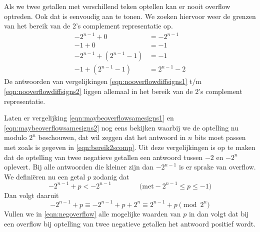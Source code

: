 \documentclass[a4paper,12pt,oneside]{article}
\theoremstyle{own}
\begin{document}
Als we twee getallen met verschillend teken optellen kan er nooit overflow
optreden. Ook dat is eenvoudig aan te tonen. We zoeken hiervoor weer de grenzen
van het bereik van de 2's complement representatie op.
%
\begin{align}
\label{eqn:nooverflowdiffsigns1}
        -2^{n-1} + 0 &= -2^{n-1} \\
              -1 + 0 &= -1 \\
-2^{n-1} + (2^{n-1}-1) &= -1 \\
\label{eqn:nooverflowdiffsigns2}
      -1 + (2^{n-1}-1) &= 2^{n-1}-2
\end{align}
%
De antwoorden van vergelijkingen \eqref{eqn:nooverflowdiffsigns1} t/m
\eqref{eqn:nooverflowdiffsigns2} liggen allemaal in het bereik van de 2's
complement representatie.

Laten er vergelijking \eqref{eqn:maybeoverflowsamesigns1} en
\eqref{eqn:maybeoverflowsamesigns2} nog eens bekijken waarbij we de optelling
nu modulo $2^n$ beschouwen, dat wil zeggen dat het antwoord in $n$ bits moet
passen met zoals is gegeven
in \eqref{eqn:bereik2scomp}. Uit deze
vergelijkingen is op te maken dat de optelling van twee negatieve getallen
een antwoord tussen $-2$ en $-2^n$ oplevert. Bij alle antwoorden die kleiner
zijn dan $-2^{n-1}$ is er sprake van overflow. We defini\"eren nu een getal
$p$ zodanig dat
\begin{equation}
-2^{n-1} + p < -2^{n-1} \qquad\qquad \mathrm{(met }-2^{n-1} \leq p \leq -1\mathrm{)}
\end{equation}
%
Dan volgt daaruit
%
\begin{equation}
\label{eqn:negoverflow}
   -2^{n-1} + p \equiv -2^{n-1} +p +2^{n} \equiv 2^{n-1} +p \pmod{2^n}
\end{equation}
%
Vullen we in \eqref{eqn:negoverflow} alle mogelijke waarden van $p$ in dan
volgt dat bij een overflow bij optelling van twee negatieve getallen het
antwoord positief wordt.
\end{document}
